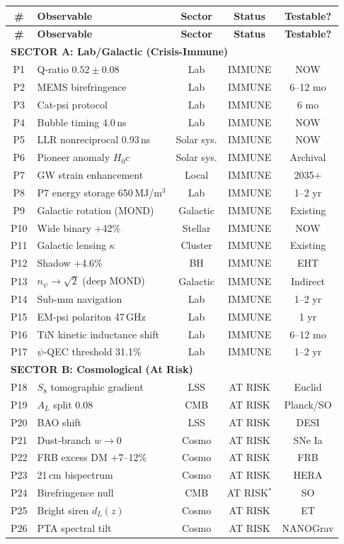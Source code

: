\documentclass[11pt]{article}
\begin{document}
\begin{longtable}{clccc}
\toprule
\textbf{\#} & \textbf{Observable} & \textbf{Sector} & \textbf{Status} & \textbf{Testable?} \\
\midrule
\endfirsthead
\toprule
\textbf{\#} & \textbf{Observable} & \textbf{Sector} & \textbf{Status} & \textbf{Testable?} \\
\midrule
\endhead
\multicolumn{5}{l}{\textbf{SECTOR A: Lab/Galactic (Crisis-Immune)}} \\
\midrule
P1 & Q-ratio $0.52 \pm 0.08$ & Lab & IMMUNE & NOW \\
P2 & MEMS birefringence & Lab & IMMUNE & 6--12 mo \\
P3 & Cat-psi protocol & Lab & IMMUNE & 6 mo \\
P4 & Bubble timing 4.0\,ns & Lab & IMMUNE & NOW \\
P5 & LLR nonreciprocal 0.93\,ns & Solar sys. & IMMUNE & NOW \\
P6 & Pioneer anomaly $H_0 c$ & Solar sys. & IMMUNE & Archival \\
P7 & GW strain enhancement & Local & IMMUNE & 2035+ \\
P8 & P7 energy storage 650\,MJ/m$^3$ & Lab & IMMUNE & 1--2 yr \\
P9 & Galactic rotation (MOND) & Galactic & IMMUNE & Existing \\
P10 & Wide binary +42\% & Stellar & IMMUNE & NOW \\
P11 & Galactic lensing $\kappa$ & Cluster & IMMUNE & Existing \\
P12 & Shadow +4.6\% & BH & IMMUNE & EHT \\
P13 & $n_\psi \to \sqrt{2}$ (deep MOND) & Galactic & IMMUNE & Indirect \\
P14 & Sub-mm navigation & Lab & IMMUNE & 1--2 yr \\
P15 & EM-psi polariton 47\,GHz & Lab & IMMUNE & 1 yr \\
P16 & TiN kinetic inductance shift & Lab & IMMUNE & 6--12 mo \\
P17 & $\psi$-QEC threshold 31.1\% & Lab & IMMUNE & 1--2 yr \\
\midrule
\multicolumn{5}{l}{\textbf{SECTOR B: Cosmological (At Risk)}} \\
\midrule
P18 & $S_8$ tomographic gradient & LSS & AT RISK & Euclid \\
P19 & $A_L$ split 0.08 & CMB & AT RISK & Planck/SO \\
P20 & BAO shift & LSS & AT RISK & DESI \\
P21 & Dust-branch $w \to 0$ & Cosmo & AT RISK & SNe Ia \\
P22 & FRB excess DM +7--12\% & Cosmo & AT RISK & FRB \\
P23 & 21\,cm bispectrum & Cosmo & AT RISK & HERA \\
P24 & Birefringence null & CMB & AT RISK$^*$ & SO \\
P25 & Bright siren $d_L(z)$ & Cosmo & AT RISK & ET \\
P26 & PTA spectral tilt & Cosmo & AT RISK & NANOGrav \\
\bottomrule
\end{longtable}
\end{document}
